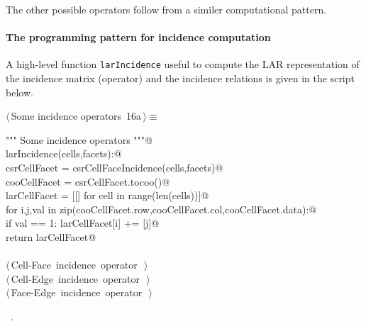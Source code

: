 \documentclass[11pt,oneside]{article}	%
\begin{document}
The other possible operators follow from a similer computational pattern.

\paragraph{The programming pattern for incidence computation}

A high-level function \texttt{larIncidence} useful to compute the LAR representation of the incidence matrix (operator) and the incidence relations is given in the script below.

\begin{flushleft} \small \label{scrap26}
\protect{}$\langle\,$Some incidence operators\nobreak\ {\footnotesize 16a}$\,\rangle\equiv$
\vspace{-1ex}
\begin{list}{}{} \item
\mbox{}\verb@""" Some incidence operators """@\\
\mbox{}\verb@def larIncidence(cells,facets):@\\
\mbox{}\verb@   csrCellFacet = csrCellFaceIncidence(cells,facets)@\\
\mbox{}\verb@   cooCellFacet = csrCellFacet.tocoo()@\\
\mbox{}\verb@   larCellFacet = [[] for cell in range(len(cells))]@\\
\mbox{}\verb@   for i,j,val in zip(cooCellFacet.row,cooCellFacet.col,cooCellFacet.data):@\\
\mbox{}\verb@      if val == 1: larCellFacet[i] += [j]@\\
\mbox{}\verb@   return larCellFacet@\\
\mbox{}\verb@@\\
\mbox{}\verb@@\hbox{$\langle\,$Cell-Face incidence operator\nobreak\ {\footnotesize {}}$\,\rangle$}\verb@@\\
\mbox{}\verb@@\hbox{$\langle\,$Cell-Edge incidence operator\nobreak\ {\footnotesize {}}$\,\rangle$}\verb@@\\
\mbox{}\verb@@\hbox{$\langle\,$Face-Edge incidence operator\nobreak\ {\footnotesize {}}$\,\rangle$}\verb@@\\
\mbox{}\verb@@{\NWsep}
\end{list}
\vspace{-1ex}
\footnotesize\addtolength{\baselineskip}{-1ex}
\begin{list}{}{\setlength{\itemsep}{-\parsep}\setlength{\itemindent}{-\leftmargin}}
\item \NWtxtMacroRefIn\ .
\end{list}
\end{flushleft}
\end{document}
